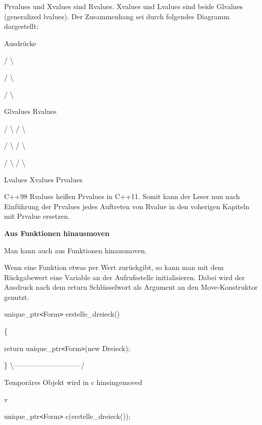 \documentclass{article}
\begin{document}
Prvalues und Xvalues sind Rvalues. Xvalues und Lvalues sind beide Glvalues (generalized 
lvalues). Der Zusammenhang sei durch folgendes Diagramm dargestellt:          

\parindent=7pt
Ausdrücke          

\parindent=36pt
/     \textbackslash{}         

\parindent=32pt
/       \textbackslash{}        

\parindent=28pt
/         \textbackslash{}    

\parindent=14pt
Glvalues   Rvalues      

\parindent=21pt
/  \textbackslash{}       /  \textbackslash{}     

\parindent=18pt
/    \textbackslash{}     /    \textbackslash{}    

\parindent=14pt
/      \textbackslash{}   /      \textbackslash{}

\parindent=0pt
Lvalues   Xvalues   Prvalues

\vspace{12pt}
C++98 Rvalues heißen Prvalues in C++11. Somit kann der Leser nun nach Einführung 
der Prvalues jedes Auftreten von Rvalue in den voherigen Kapiteln mit Prvalue ersetzen.

\vspace{25pt}
\textbf{Aus Funktionen hinausmoven}

Man kann auch aus Funktionen hinausmoven.

Wenn eine Funktion etwas per Wert zurückgibt, so kann man mit dem Rückgabewert 
eine Variable an der Aufrufsstelle initialisieren. Dabei wird der Ausdruck nach 
dem return Schlüsselwort als Argument an den Move-Konstruktor genutzt.

unique\_ptr\texttt{<}Form\texttt{>} erstelle\_dreieck()

\{    

\parindent=14pt
return unique\_ptr\texttt{<}Form\texttt{>}(new Dreieck);

\parindent=0pt
\}          \textbackslash{}-----------------------------/                  

\parindent=64pt
\textbar{}                  

\textbar{} Temporäres Objekt wird in c hineingemoved                  

\textbar{}                  

\parindent=129pt
v

\parindent=0pt
unique\_ptr\texttt{<}Form\texttt{>} c(erstelle\_dreieck());
\end{document}
